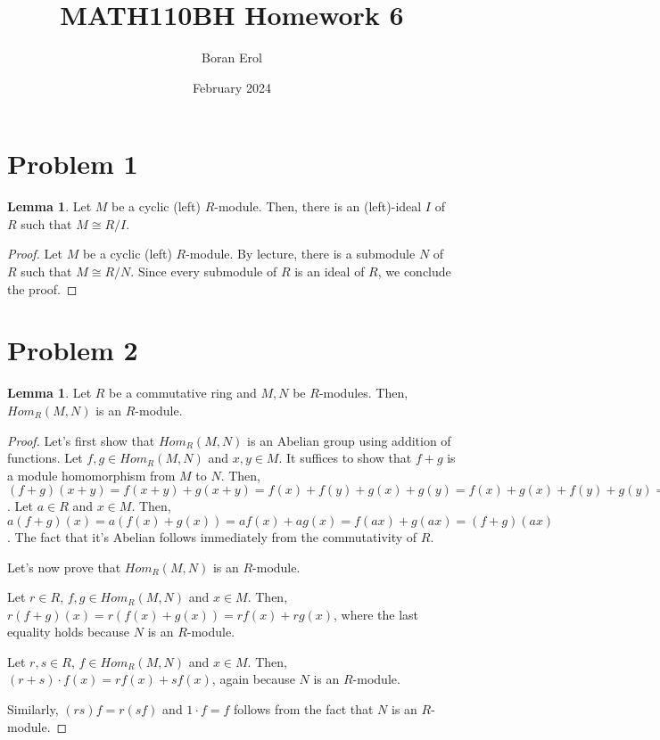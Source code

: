 \documentclass{article}
\title{MATH110BH Homework 6}
\date{February 2024}
\author{Boran Erol}
\theoremstyle{definition}
\newtheorem{lemma}[theorem]{Lemma}
\begin{document}
\maketitle

\section{Problem 1}

\begin{lemma}
    Let $M$ be a cyclic (left) $R$-module. Then, there is an (left)-ideal $I$ of $R$ such that $M \cong R/I$.
\end{lemma}
\begin{proof}
    Let $M$ be a cyclic (left) $R$-module. By lecture, there is a submodule $N$ of $R$ such that $M \cong R/N$. Since every submodule of $R$ is an ideal of $R$, we conclude the proof.
\end{proof}

\section{Problem 2}

\begin{lemma}
    Let $R$ be a commutative ring and $M,N$ be $R$-modules. Then, $Hom_{R}(M,N)$ is an $R$-module. 
\end{lemma}
\begin{proof}
     Let's first show that $Hom_{R}(M,N)$ is an Abelian group using addition of functions. Let $f,g \in Hom_{R}(M,N)$ and $x,y \in M$. It suffices to show that $f+g$ is a module homomorphism from $M$ to $N$. Then, $(f + g)(x + y) = f(x+y) + g(x+y) = f(x) + f(y) + g(x) + g(y) = f(x) + g(x) + f(y) + g(y) = (f+g)(x) + (f+g)(y)$. Let $a \in R$ and $x \in M$. Then, $a(f+g)(x) = a (f(x) + g(x)) = af(x) + ag(x) = f(ax) + g(ax) = (f+g)(ax)$. The fact that it's Abelian follows immediately from the commutativity of $R$.

    Let's now prove that $Hom_{R}(M,N)$ is an $R$-module. 
     
    Let $r \in R$, $f,g \in Hom_{R}(M,N)$ and $x \in M$. Then, $r(f+g)(x) = r(f(x) + g(x)) = rf(x) + rg(x)$, where the last equality holds because $N$ is an $R$-module.

    Let $r,s \in R$, $f \in Hom_{R}(M,N)$ and $x \in M$. Then, $(r + s) \cdot f(x) = rf(x) + sf(x)$, again because $N$ is an $R$-module.

    Similarly, $(rs)f = r(sf)$ and $1 \cdot f = f$ follows from the fact that $N$ is an $R$-module.
\end{proof}
\end{document}
